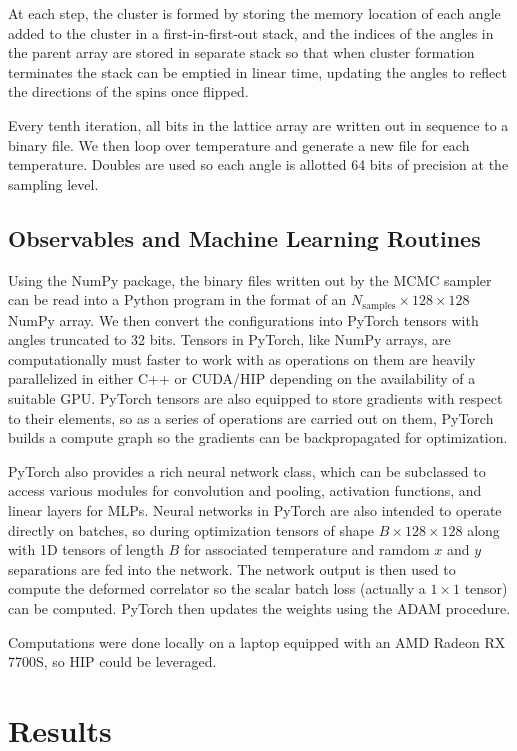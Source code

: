 \documentclass[12pt]{article}
\begin{document}
At each step, the cluster is formed by storing the memory location of each angle added to the cluster in a first-in-first-out stack, and
the indices of the angles in the parent array are stored in separate stack so that when cluster formation terminates the stack can be
emptied in linear time, updating the angles to reflect the directions of the spins once flipped.

Every tenth iteration, all bits in the lattice array are written out in sequence to a binary file. We then loop over temperature
and generate a new file for each temperature. Doubles are used so each angle is allotted 64 bits of precision at the sampling level.

\subsection{Observables and Machine Learning Routines}

Using the NumPy package, the binary files written out by the MCMC sampler can be read into a Python program in the format of an $N_\mathrm{samples}\times 128 \times 128$ NumPy array.
We then convert the configurations into PyTorch \cite{NEURIPS2019_9015} tensors with angles truncated to 32 bits. Tensors in PyTorch, like NumPy arrays, are computationally must faster to work with as operations on them
are heavily parallelized in either C++ or CUDA/HIP depending on the availability of a suitable GPU. PyTorch tensors are also equipped to store
gradients with respect to their elements, so as a series of operations are carried out on them, PyTorch builds a compute graph so the gradients can be backpropagated for optimization.

PyTorch also provides a rich neural network class, which can be subclassed to access various modules for convolution and pooling, activation functions,
and linear layers for MLPs. Neural networks in PyTorch are also intended to operate directly on batches, so during optimization tensors of shape $B\times 128 \times 128$
along with 1D tensors of length $B$ for associated temperature and ramdom $x$ and $y$ separations are fed into the network. The network output is then used to compute
the deformed correlator so the scalar batch loss (actually a $1\times1$ tensor) can be computed. PyTorch then updates the weights using the ADAM
procedure.

Computations were done locally on a laptop equipped with an AMD Radeon RX 7700S, so HIP could be leveraged.

\section{Results}
\end{document}
